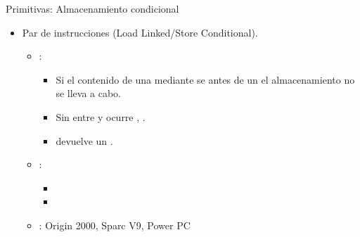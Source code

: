 \begin{frame}[t]{Primitivas: Almacenamiento condicional}
\begin{itemize}
  \item Par de instrucciones  (Load Linked/Store Conditional).
    \begin{itemize}

      \item {}:
        \begin{itemize}
          \item Si el contenido de una  mediante  
                se  antes de un  el almacenamiento no se lleva a cabo.
          \item Sin entre  y  ocurre , 
                 .
          \item {} devuelve un .
        \end{itemize}

      \item {}:
        \begin{itemize}
          \item {}
          \item {}
        \end{itemize}

      \item {}: Origin 2000, Sparc V9, Power PC
    \end{itemize}
\end{itemize}
\end{frame}
